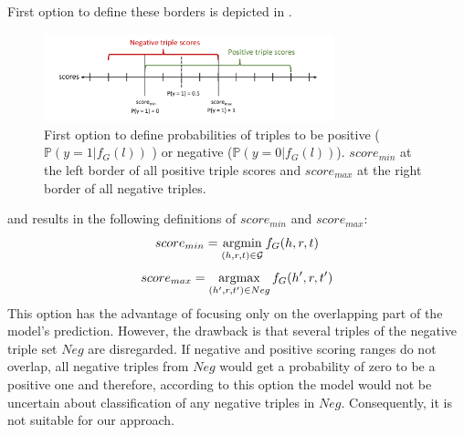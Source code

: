 First option to define these borders is depicted in .
\begin{figure}[t]
  \centering
    \includegraphics[width=0.75\textwidth]{figures/positives_negatives1.pdf}
  \caption{First option to define probabilities of triples to be positive ($\mathds{P}(y = 1 | f_G(l))$ ) or negative ($\mathds{P}(y = 0 | f_G(l))$). 
  $score_{min}$ at the left border of all positive triple scores and $score_{max}$ at the right border of all negative triples.}
  \label{fig:positives_negatives1}
\end{figure}
and results in the following definitions of  $score_{min}$ and 
$score_{max}$:
\begin{equation} \label{eqn:opt2_score_min}
    score_{min} = \operatorname*{argmin}_{(h,r,t) \in \mathcal{G}}{f_G(h,r,t)}
\end{equation}
\begin{equation} \label{eqn:opt2_score_max}
    score_{max} = \operatorname*{argmax}_{(h',r,t') \in Neg}{f_G(h',r,t')}
\end{equation}
This option has the advantage of focusing only on the overlapping part of the model's prediction.
However, the drawback is that several triples of the negative triple set $Neg$ are disregarded.
If negative and positive scoring ranges do not overlap, all negative triples from $Neg$ would get a probability of zero to be a positive one and therefore, according to this option the model would not be uncertain about classification of any negative triples in $Neg$.
Consequently, it is not suitable for our approach.

